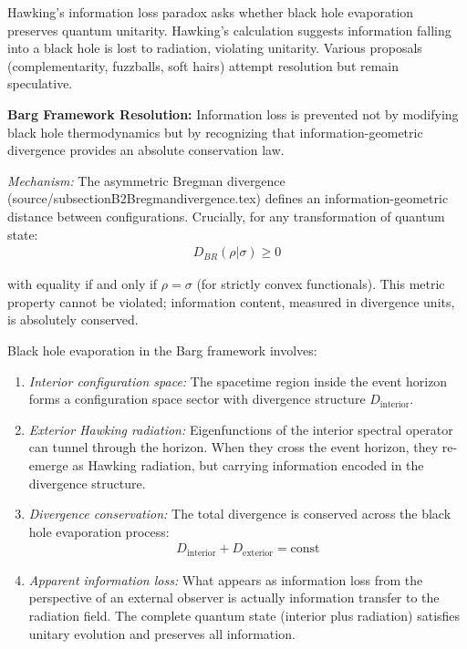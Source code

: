 \documentclass[12pt,a4paper]{article}
\begin{document}
Hawking's information loss paradox asks whether black hole evaporation preserves quantum unitarity. Hawking's calculation suggests information falling into a black hole is lost to radiation, violating unitarity. Various proposals (complementarity, fuzzballs, soft hairs) attempt resolution but remain speculative.

\textbf{Barg Framework Resolution:} Information loss is prevented not by modifying black hole thermodynamics but by recognizing that information-geometric divergence provides an absolute conservation law.

\textit{Mechanism:} The asymmetric Bregman divergence (source/subsectionB2Bregmandivergence.tex) defines an information-geometric distance between configurations. Crucially, for any transformation of quantum state:
\begin{align}
D_{BR}(\rho | \sigma) \geq 0
\end{align}

with equality if and only if $\rho = \sigma$ (for strictly convex functionals). This metric property cannot be violated; information content, measured in divergence units, is absolutely conserved.

Black hole evaporation in the Barg framework involves:

\begin{enumerate}
\item \textit{Interior configuration space:} The spacetime region inside the event horizon forms a configuration space sector with divergence structure $D_{\text{interior}}$.

\item \textit{Exterior Hawking radiation:} Eigenfunctions of the interior spectral operator can tunnel through the horizon. When they cross the event horizon, they re-emerge as Hawking radiation, but carrying information encoded in the divergence structure.

\item \textit{Divergence conservation:} The total divergence is conserved across the black hole evaporation process:
\begin{align}
D_{\text{interior}} + D_{\text{exterior}} = \text{const}
\end{align}

\item \textit{Apparent information loss:} What appears as information loss from the perspective of an external observer is actually information transfer to the radiation field. The complete quantum state (interior plus radiation) satisfies unitary evolution and preserves all information.
\end{enumerate}
\end{document}
